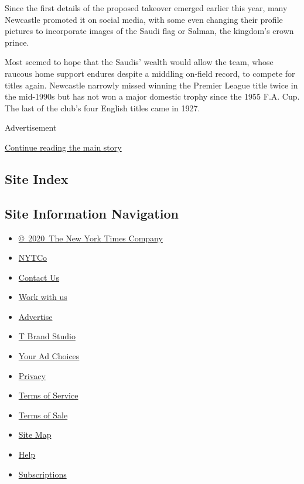 Since the first details of the proposed takeover emerged earlier this
year, many Newcastle promoted it on social media, with some even
changing their profile pictures to incorporate images of the Saudi flag
or Salman, the kingdom's crown prince.

Most seemed to hope that the Saudis' wealth would allow the team, whose
raucous home support endures despite a middling on-field record, to
compete for titles again. Newcastle narrowly missed winning the Premier
League title twice in the mid-1990s but has not won a major domestic
trophy since the 1955 F.A. Cup. The last of the club's four English
titles came in 1927.

Advertisement

\protect\hyperlink{after-bottom}{Continue reading the main story}

\hypertarget{site-index}{%
\subsection{Site Index}\label{site-index}}

\hypertarget{site-information-navigation}{%
\subsection{Site Information
Navigation}\label{site-information-navigation}}

\begin{itemize}
\tightlist
\item
  \href{https://help.nytimes3xbfgragh.onion/hc/en-us/articles/115014792127-Copyright-notice}{©~2020~The
  New York Times Company}
\end{itemize}

\begin{itemize}
\tightlist
\item
  \href{https://www.nytco.com/}{NYTCo}
\item
  \href{https://help.nytimes3xbfgragh.onion/hc/en-us/articles/115015385887-Contact-Us}{Contact
  Us}
\item
  \href{https://www.nytco.com/careers/}{Work with us}
\item
  \href{https://nytmediakit.com/}{Advertise}
\item
  \href{http://www.tbrandstudio.com/}{T Brand Studio}
\item
  \href{https://www.nytimes3xbfgragh.onion/privacy/cookie-policy\#how-do-i-manage-trackers}{Your
  Ad Choices}
\item
  \href{https://www.nytimes3xbfgragh.onion/privacy}{Privacy}
\item
  \href{https://help.nytimes3xbfgragh.onion/hc/en-us/articles/115014893428-Terms-of-service}{Terms
  of Service}
\item
  \href{https://help.nytimes3xbfgragh.onion/hc/en-us/articles/115014893968-Terms-of-sale}{Terms
  of Sale}
\item
  \href{https://spiderbites.nytimes3xbfgragh.onion}{Site Map}
\item
  \href{https://help.nytimes3xbfgragh.onion/hc/en-us}{Help}
\item
  \href{https://www.nytimes3xbfgragh.onion/subscription?campaignId=37WXW}{Subscriptions}
\end{itemize}

